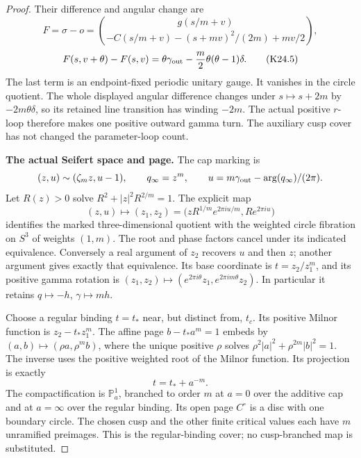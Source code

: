 \begin{proof}
Their difference and angular change are
\[
 F=\sigma-o=
 \binom{g(s/m+v)}{-C(s/m+v)-(s+mv)^2/(2m)+mv/2},
\]
\[
 F(s,v+\theta)-F(s,v)
 =\theta\gamma_{\rm out}
          -\frac m2\theta(\theta-1)\delta.             \tag{K24.5}
\]
The last term is an endpoint-fixed periodic unitary gauge.
It vanishes in the circle quotient. The whole displayed angular
difference changes under $s\mapsto s+2m$ by $-2m\theta\delta$, so its retained
line transition has winding $-2m$. The actual positive $r$-loop
therefore makes one positive outward gamma turn. The auxiliary
cusp cover has not changed the parameter-loop count.

\par\medskip\noindent\textbf{The actual Seifert space and page.}
The cap marking is
\[
 (z,u)\sim(\zeta_mz,u-1),\qquad q_\infty=z^m,
 \qquad u=m\gamma_{\rm out}-\arg(q_\infty)/(2\pi).
\]
Let $R(z)>0$ solve $R^2+|z|^2R^{2/m}=1$. The explicit map
\[
 (z,u)\longmapsto
 (z_1,z_2)=
 \bigl(zR^{1/m}e^{2\pi iu/m},R e^{2\pi iu}\bigr)       \tag{K24.6}
\]
identifies the marked three-dimensional quotient with the
weighted circle fibration on $S^3$ of weights $(1,m)$.
The root and phase factors cancel under its indicated equivalence.
Conversely a real argument of $z_2$ recovers $u$ and then $z$;
another argument gives exactly that equivalence. Its base
coordinate is $t=z_2/z_1^m$, and its positive gamma rotation
is $(z_1,z_2)\mapsto(e^{2\pi i\theta}z_1,
e^{2\pi im\theta}z_2)$. In particular it retains
$q\mapsto-h$, $\gamma\mapsto mh$.

Choose a regular binding $t=t_*$ near, but distinct from,
$t_c$. Its positive Milnor function is $z_2-t_*z_1^m$.
The affine page $b-t_*a^m=1$ embeds by
$(a,b)\mapsto(\rho a,\rho^mb)$, where the unique positive
$\rho$ solves $\rho^2|a|^2+\rho^{2m}|b|^2=1$.
The inverse uses the positive weighted root of the Milnor
function. Its projection is exactly
\[
                         t=t_*+a^{-m}.                 \tag{K24.7}
\]
The compactification is $\mathbb P^1_a$, branched to order
$m$ at $a=0$ over the additive cap and at $a=\infty$ over
the regular binding. Its open page $C^\circ$ is a disc with
one boundary circle. The chosen cusp and the other finite
critical values each have $m$ unramified preimages. This is
the regular-binding cover; no cusp-branched map is substituted.


\end{proof}
